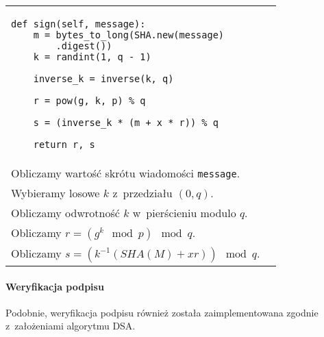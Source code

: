 \documentclass{article}
\begin{document}
        \noindent\begin{table}[ht!]
            \begin{tabular}{lr}
                \begin{minipage}[t]{0.45\textwidth}
                    \begin{verbatim}
def sign(self, message):
    m = bytes_to_long(SHA.new(message)
        .digest())
    k = randint(1, q - 1)
    
    inverse_k = inverse(k, q)
    
    r = pow(g, k, p) % q
    
    s = (inverse_k * (m + x * r)) % q

    return r, s
                    \end{verbatim}
                \end{minipage}
                
                &
        
                \begin{minipage}[t]{0.45\textwidth}                    
                    \noindent \\ Obliczamy wartość skrótu wiadomości \verb+message+. \\
                    
                    \noindent Wybieramy losowe $k$ z~przedziału $(0, q)$. \\
                    
                    \noindent Obliczamy odwrotność $k$ w~pierścieniu modulo $q$. \\
                    
                    \noindent Obliczamy $r = (g^{k} \mod p) \mod q$. \\
                    
                    \noindent Obliczamy $s = (k^{-1} (SHA(M) + xr)) \mod q$.
                \end{minipage}
            
                \\
            
            \end{tabular}
        \end{table}
        
        \paragraph{Weryfikacja podpisu} Podobnie, weryfikacja podpisu również została zaimplementowana zgodnie z~założeniami algorytmu DSA.
        
\end{document}

